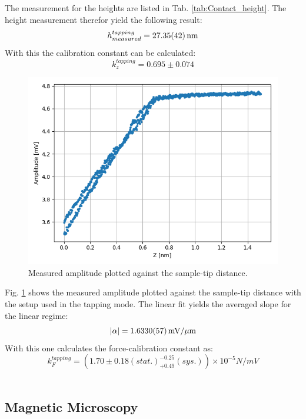 \documentclass[%
 reprint,
amsmath,amssymb,
pra,
]{revtex4-1}
\begin{document}
The measurement for the heights are listed in Tab. \ref{tab:Contact_height}. The height measurement therefor yield the following result:
\begin{equation*}
h_{measured}^{tapping} = \SI{27.35 \pm 0.42}{nm}
\end{equation*}
With this the calibration constant can be calculated:
\begin{equation*}
k_z^{tapping} = 0.695 \pm 0.074
\end{equation*}

\begin{figure}
\centering
\includegraphics[scale=0.5]{Bilder/Tapping_Mode/Snap_in_curve.PNG}
\caption{Measured amplitude plotted against the sample-tip distance.}
\label{fig:Tapping_snap_in}
\end{figure}

Fig. \ref{fig:Tapping_snap_in} shows the measured amplitude plotted against the sample-tip distance with the setup used in the tapping mode. The linear fit yields the averaged slope for the linear regime:
\begin{equation*} 
|\alpha| = \SI{1.6330 \pm 0.0057}{mV \per \mu m}
\end{equation*}
With this one calculates the force-calibration constant as:
\begin{equation*}
k_F^{tapping} = (1.70 \pm 0.18 (stat.) _{+ 0.49} ^{- 0.25} (sys.)) \times 10^{-5} \si{N \per mV}
\end{equation*}
\\
\subsection{Magnetic Microscopy}
\end{document}
